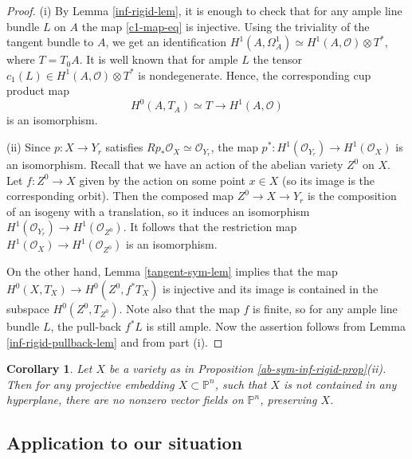 \documentclass[reqno]{amsart}
\newtheorem{cor}[theorem]{Corollary}
\theoremstyle{definition}
\theoremstyle{remark}
\newcommand{\Om}{\Omega}
\renewcommand{\P}{{\mathbb P}}
\newcommand{\wt}{\widetilde}
\newcommand{\ot}{\otimes}
\newcommand{\OO}{{\mathcal O}}
\newcommand{\sub}{\subset}
\numberwithin{equation}{section}
\begin{document}
\begin{proof} 
(i) By Lemma \ref{inf-rigid-lem}, it is enough to check that for any ample line bundle $L$ on $A$ the map \eqref{c1-map-eq} is injective.
Using the triviality of the tangent bundle to $A$, we get an identification
$H^1(A,\Om^1_A)\simeq H^1(A,\OO)\ot T^*$, where $T=T_0A$. It is well known that for ample $L$ the tensor $c_1(L)\in H^1(A,\OO)\ot T^*$ is nondegenerate.
Hence, the corresponding cup product map
$$H^0(A,T_A)\simeq T\to H^1(A,\OO)$$ 
is an isomorphism.

(ii) Since $p:X\to Y_r$ satisfies $Rp_*\OO_X\simeq \OO_{Y_r}$, the map $p^*:H^1(\OO_{Y_r})\to H^1(\OO_X)$ is an isomorphism.
Recall that we have an action of the abelian variety $Z^0$ on $X$.
Let $f:Z^0\to X$ given by the action on some point $x\in X$ (so its image is the corresponding orbit). 
Then the composed map $Z^0\to X\to Y_r$ is the composition of an isogeny with a translation,
so it induces an isomorphism $H^1(\OO_{Y_r})\to H^1(\OO_{Z^0})$. It follows that the restriction map $H^1(\OO_X)\to H^1(\OO_{Z^0})$ is an isomorphism.

On the other hand, Lemma \ref{tangent-sym-lem} implies that the map $H^0(X,T_X)\to H^0(Z^0,f^*T_X)$ is injective and its image is contained in the subspace
$H^0(Z^0,T_{Z^0})$. Note also that the map $f$ is finite, so for any ample line bundle $L$, the pull-back $f^*L$ is still ample. Now the assertion follows 
from Lemma \ref{inf-rigid-pullback-lem} and from part (i).
\end{proof}

\begin{cor}\label{no-vec-fields-cor} 
Let $X$ be a variety as in Proposition \ref{ab-sym-inf-rigid-prop}(ii). Then for any projective embedding
$X\sub \P^n$, such that $X$ is not contained in any hyperplane, there are no nonzero vector fields on $\P^n$,
preserving $X$.
\end{cor} 

\subsection{Application to our situation}
\end{document}
